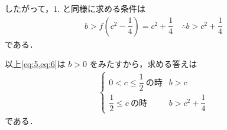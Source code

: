\documentclass[../../main.tex]{subfiles}
\begin{document}
したがって，$1.$ と同様に求める条件は
\begin{align}
  b>f\left(c^2-\dfrac{1}{4}\right)=c^2+\dfrac{1}{4} \quad \therefore b > c^2+\dfrac{1}{4} \label{eq:6}
\end{align}
である．
\casesend

以上\cref{eq:5,eq:6}は $b>0$ をみたすから，求める答えは
\begin{align}
  \begin{cases}
    0<c\le\dfrac{1}{2}\ \text{の時} & b>c \\
    \dfrac{1}{2}\le c\ \text{の時} & b>c^2+\dfrac{1}{4}
  \end{cases}
\end{align}
である．

\newpage
\end{document}
